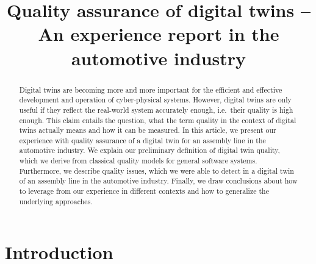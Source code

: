 \documentclass[conference]{IEEEtran}
\begin{document}
    \title{Quality assurance of digital twins -- An experience report in the automotive industry}
    \author{
        \and
    }
    \maketitle

    \begin{abstract}
        Digital twins are becoming more and more important for the efficient and effective development and operation of cyber-physical systems.
        However, digital twins are only useful if they reflect the real-world system accurately enough, i.e.\ their quality is high enough.
        This claim entails the question, what the term quality in the context of digital twins actually means and how it can be measured.
        In this article, we present our experience with quality assurance of a digital twin for an assembly line in the automotive industry.
        We explain our preliminary definition of digital twin quality, which we derive from classical quality models for general software systems.
        Furthermore, we describe quality issues, which we were able to detect in a digital twin of an assembly line in the automotive industry.
        Finally, we draw conclusions about how to leverage from our experience in different contexts and how to generalize the underlying approaches.
    \end{abstract}

    \section{Introduction}\label{section:introduction}
\end{document}
